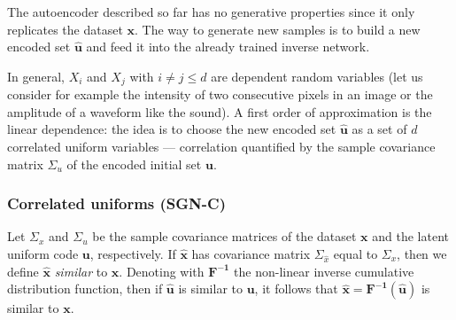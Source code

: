 The autoencoder described so far has no generative properties since it only replicates the dataset $\mathbf{x}$. The way to generate new samples is to build a new encoded set $\mathbf{\hat{u}}$ and feed it into the already trained inverse network. 

In general, $X_i$ and $X_j$ with $i\neq j \leq d$ are dependent random variables (let us consider for example the intensity of two consecutive pixels in an image or the amplitude of a waveform like the sound). A first order of approximation is the linear dependence: the idea is to choose the new encoded set $\mathbf{\hat{u}}$ as a set of $d$ correlated uniform variables — correlation quantified by the sample covariance matrix $\Sigma_u$ of the encoded initial set $\mathbf{u}$.


\subsubsection{Correlated uniforms (SGN-C)}
\label{subsec:sgn_correlated_uniforms}

Let $\Sigma_x$ and $\Sigma_u$ be the sample covariance matrices of the dataset $\mathbf{x}$ and the latent uniform code $\mathbf{u}$, respectively. If $\mathbf{\hat{x}}$ has covariance matrix $\Sigma_{\hat{x}}$ equal to $\Sigma_x$, then we define $\mathbf{\hat{x}}$ \textit{similar} to $\mathbf{x}$. 
Denoting with $\mathbf{F^{-1}}$ the non-linear inverse cumulative distribution function, then if $\mathbf{\hat{u}}$ is similar to $\mathbf{u}$, it follows that $\mathbf{\hat{x}} = \mathbf{F^{-1}(\hat{u})}$ is similar to $\mathbf{x}$. 

